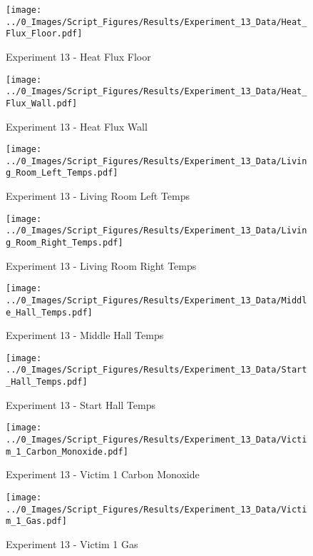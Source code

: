 	\clearpage

	\begin{figure}[H]
		\centering
		\texttt{[image: ../0\_Images/Script\_Figures/Results/Experiment\_13\_Data/Heat\_Flux\_Floor.pdf]}
		\caption[]{Experiment 13 - Heat Flux Floor}
	\end{figure}
 

	\begin{figure}[H]
		\centering
		\texttt{[image: ../0\_Images/Script\_Figures/Results/Experiment\_13\_Data/Heat\_Flux\_Wall.pdf]}
		\caption[]{Experiment 13 - Heat Flux Wall}
	\end{figure}
 
	\clearpage

	\begin{figure}[H]
		\centering
		\texttt{[image: ../0\_Images/Script\_Figures/Results/Experiment\_13\_Data/Living\_Room\_Left\_Temps.pdf]}
		\caption[]{Experiment 13 - Living Room Left Temps}
	\end{figure}
 

	\begin{figure}[H]
		\centering
		\texttt{[image: ../0\_Images/Script\_Figures/Results/Experiment\_13\_Data/Living\_Room\_Right\_Temps.pdf]}
		\caption[]{Experiment 13 - Living Room Right Temps}
	\end{figure}
 
	\clearpage

	\begin{figure}[H]
		\centering
		\texttt{[image: ../0\_Images/Script\_Figures/Results/Experiment\_13\_Data/Middle\_Hall\_Temps.pdf]}
		\caption[]{Experiment 13 - Middle Hall Temps}
	\end{figure}
 

	\begin{figure}[H]
		\centering
		\texttt{[image: ../0\_Images/Script\_Figures/Results/Experiment\_13\_Data/Start\_Hall\_Temps.pdf]}
		\caption[]{Experiment 13 - Start Hall Temps}
	\end{figure}
 
	\clearpage

	\begin{figure}[H]
		\centering
		\texttt{[image: ../0\_Images/Script\_Figures/Results/Experiment\_13\_Data/Victim\_1\_Carbon\_Monoxide.pdf]}
		\caption[]{Experiment 13 - Victim 1 Carbon Monoxide}
	\end{figure}
 

	\begin{figure}[H]
		\centering
		\texttt{[image: ../0\_Images/Script\_Figures/Results/Experiment\_13\_Data/Victim\_1\_Gas.pdf]}
		\caption[]{Experiment 13 - Victim 1 Gas}
	\end{figure}
 
